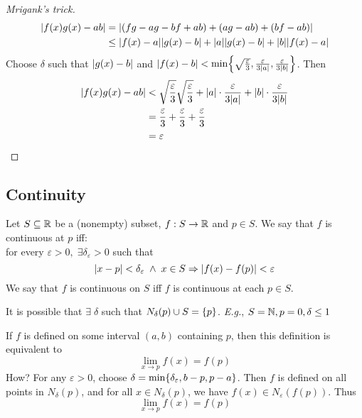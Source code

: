 \documentclass[12pt]{article}
\begin{document}
\begin{proof}[Mrigank's trick]
    \begin{align*}
        \abs{ f(x) g(x) - ab } &= \abs{ (fg - ag - bf + ab) + (ag - ab) + (bf - ab) } \\
        &\leq \abs{ f(x) - a } \abs{ g(x) - b } + \abs{ a } \abs{ g(x) - b } + \abs{ b }\abs{ f(x) - a }
    \end{align*}
    Choose $\delta$ such that $\abs{ g(x) - b }$ and $\abs{ f(x) - b } < \min \set{\sqrt{\frac{\varepsilon}{3}}, \frac{\varepsilon}{3\abs{ a}}, \frac{\varepsilon}{3\abs{ b}}}$. Then
    \begin{align*}
        \abs{ f(x) g(x) - ab } &< \sqrt{\frac{\varepsilon}{3}} \sqrt{\frac{\varepsilon}{3}} + \abs{ a } \cdot \frac{\varepsilon}{3\abs{ a}} + \abs{ b} \cdot \frac{\varepsilon}{3 \abs{ b}} \\
        &= \frac{\varepsilon}{3} + \frac{\varepsilon}{3} + \frac{\varepsilon}{3} \\
        &= \varepsilon \qedhere
    \end{align*}
\end{proof}

\subsection{Continuity}
\begin{defn} \label{defn:continuous}
    Let $S \subseteq \mathbb{R}$ be a (nonempty) subset, $f: S \to \mathbb{R}$ and $p \in S$. We say that $f$ is continuous at $p$ iff: \\
    for every $\varepsilon > 0, \;\exists \delta_{\varepsilon} > 0$ such that \[
        \abs{ x - p } < \delta_{\varepsilon} \;\land\; x \in S \implies \abs{ f(x) - f(p) } < \varepsilon
    \] We say that $f$ is continuous on $S$ iff $f$ is continuous at each $p \in S$.
\end{defn}
\begin{rem}
    It is possible that $\exists\; \delta$ such that $N_{\delta}(p) \cup S = \set{p}$. \textit{E.g.}, $S = \mathbb{N}, p = 0, \delta \leq 1$
\end{rem}
\begin{rem}
    If $f$ is defined on some interval $(a, b)$ containing $p$, then this definition is equivalent to \[
        \lim_{x \to p} f(x) = f(p)
    \] \textcolor{red!85!black}{How?} For any $\varepsilon > 0$, choose $\delta = \min \set{\delta_{\varepsilon}, b - p, p - a}$. Then $f$ is defined on all points in $N_{\delta}(p)$, and for all $x \in N_{\delta}(p)$, we have $f(x) \in N_{\varepsilon}(f(p))$. Thus \[
        \lim_{x \to p} f(x) = f(p)
    \]
\end{rem}
\end{document}

